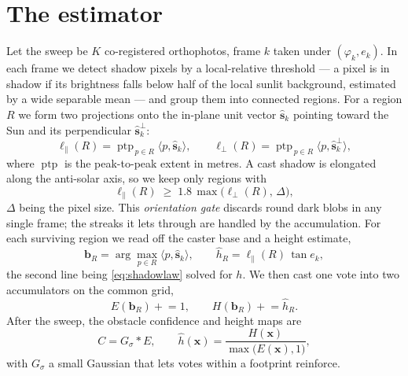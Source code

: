 \documentclass[11pt]{article}
\begin{document}
\section{The estimator}

Let the sweep be $K$ co-registered orthophotos, frame $k$ taken under $(\varphi_k,e_k)$. In
each frame we detect shadow pixels by a local-relative threshold --- a pixel is in shadow if
its brightness falls below half of the local sunlit background, estimated by a wide
separable mean --- and group them into connected regions. For a region $R$ we form two
projections onto the in-plane unit vector $\hat{\mathbf{s}}_k$ pointing toward the Sun and
its perpendicular $\hat{\mathbf{s}}_k^{\perp}$:
\begin{equation}
  \ell_{\parallel}(R)=\operatorname{ptp}_{\,p\in R}\langle p,\hat{\mathbf{s}}_k\rangle,
  \qquad
  \ell_{\perp}(R)=\operatorname{ptp}_{\,p\in R}\langle p,\hat{\mathbf{s}}_k^{\perp}\rangle ,
\end{equation}
where $\operatorname{ptp}$ is the peak-to-peak extent in metres. A cast shadow is elongated
along the anti-solar axis, so we keep only regions with
\begin{equation}
  \ell_{\parallel}(R)\;\ge\;1.8\,\max\!\big(\ell_{\perp}(R),\,\Delta\big),
  \label{eq:gate}
\end{equation}
$\Delta$ being the pixel size. This \emph{orientation gate} discards round dark blobs in any
single frame; the streaks it lets through are handled by the accumulation. For each
surviving region we read off the caster base and a height estimate,
\begin{equation}
  \mathbf{b}_R=\arg\max_{p\in R}\langle p,\hat{\mathbf{s}}_k\rangle,
  \qquad
  \hat h_R=\ell_{\parallel}(R)\,\tan e_k ,
  \label{eq:vote}
\end{equation}
the second line being \cref{eq:shadowlaw} solved for $h$. We then cast one vote into two
accumulators on the common grid,
\begin{equation}
  E(\mathbf{b}_R)\mathrel{+}=1,
  \qquad
  H(\mathbf{b}_R)\mathrel{+}=\hat h_R .
\end{equation}
After the sweep, the obstacle confidence and height maps are
\begin{equation}
  C=G_{\sigma}\!*E,
  \qquad
  \widehat{h}(\mathbf{x})=\frac{H(\mathbf{x})}{\max\!\big(E(\mathbf{x}),1\big)} ,
  \label{eq:maps}
\end{equation}
with $G_\sigma$ a small Gaussian that lets votes within a footprint reinforce.
\end{document}
